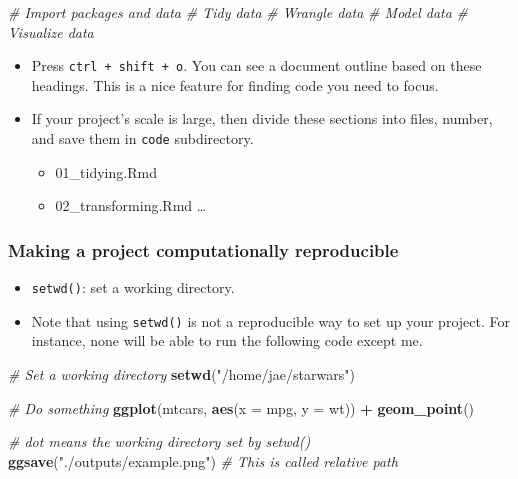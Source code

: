 \documentclass[
]{book}
\newenvironment{Shaded}{\begin{snugshade}}{\end{snugshade}}
\newcommand{\CommentTok}[1]{\textcolor[rgb]{0.56,0.35,0.01}{\textit{#1}}}
\newcommand{\DataTypeTok}[1]{\textcolor[rgb]{0.13,0.29,0.53}{#1}}
\newcommand{\KeywordTok}[1]{\textcolor[rgb]{0.13,0.29,0.53}{\textbf{#1}}}
\newcommand{\NormalTok}[1]{#1}
\newcommand{\OperatorTok}[1]{\textcolor[rgb]{0.81,0.36,0.00}{\textbf{#1}}}
\newcommand{\StringTok}[1]{\textcolor[rgb]{0.31,0.60,0.02}{#1}}
\providecommand{\tightlist}{%
  \setlength{\itemsep}{0pt}\setlength{\parskip}{0pt}}
\begin{document}
\begin{Shaded}
\begin{Highlighting}[]
\CommentTok{\# Import packages and data}
\CommentTok{\# Tidy data}
\CommentTok{\# Wrangle data}
\CommentTok{\# Model data}
\CommentTok{\# Visualize data}
\end{Highlighting}
\end{Shaded}

\begin{itemize}
\item
  Press \texttt{ctrl\ +\ shift\ +\ o}. You can see a document outline based on these headings. This is a nice feature for finding code you need to focus.
\item
  If your project's scale is large, then divide these sections into files, number, and save them in \texttt{code} subdirectory.

  \begin{itemize}
  \tightlist
  \item
    01\_tidying.Rmd
  \item
    02\_transforming.Rmd
    \ldots{}
  \end{itemize}
\end{itemize}

\hypertarget{making-a-project-computationally-reproducible}{%
\subsubsection{Making a project computationally reproducible}\label{making-a-project-computationally-reproducible}}

\begin{itemize}
\item
  \texttt{setwd()}: set a working directory.
\item
  Note that using \texttt{setwd()} is not a reproducible way to set up your project. For instance, none will be able to run the following code except me.
\end{itemize}

\begin{Shaded}
\begin{Highlighting}[]
\CommentTok{\# Set a working directory }
\KeywordTok{setwd}\NormalTok{(}\StringTok{"/home/jae/starwars"}\NormalTok{)}

\CommentTok{\# Do something }
\KeywordTok{ggplot}\NormalTok{(mtcars, }\KeywordTok{aes}\NormalTok{(}\DataTypeTok{x =}\NormalTok{ mpg, }\DataTypeTok{y =}\NormalTok{ wt)) }\OperatorTok{+}
\StringTok{   }\KeywordTok{geom\_point}\NormalTok{()}

\CommentTok{\# dot means the working directory set by setwd()}
\KeywordTok{ggsave}\NormalTok{(}\StringTok{"./outputs/example.png"}\NormalTok{) }\CommentTok{\# This is called relative path }
\end{Highlighting}
\end{Shaded}
\end{document}
